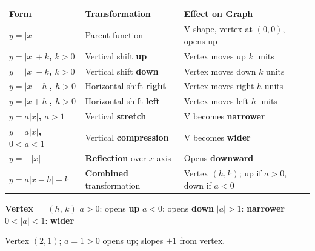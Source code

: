 \documentclass[11pt]{article}
\begin{document}
\begin{tcolorbox}[tablebox,title={Transformation Summary Table: $y = a|x-h|+k$}]
\renewcommand{\arraystretch}{1.35}
\begin{tabular}{>{\bfseries}p{3.5cm} p{4.5cm} p{5.5cm}}
\toprule
\textbf{Form} & \textbf{Transformation} & \textbf{Effect on Graph} \\
\midrule
$y=|x|$ & Parent function & V-shape, vertex at $(0,0)$, opens up \\
$y=|x|+k$,\; $k>0$ & Vertical shift \textbf{up} & Vertex moves up $k$ units \\
$y=|x|-k$,\; $k>0$ & Vertical shift \textbf{down} & Vertex moves down $k$ units \\
$y=|x-h|$,\; $h>0$ & Horizontal shift \textbf{right} & Vertex moves right $h$ units \\
$y=|x+h|$,\; $h>0$ & Horizontal shift \textbf{left} & Vertex moves left $h$ units \\
$y=a|x|$,\; $a>1$ & Vertical \textbf{stretch} & V becomes \textbf{narrower} \\
$y=a|x|$,\; $0<a<1$ & Vertical \textbf{compression} & V becomes \textbf{wider} \\
$y=-|x|$ & \textbf{Reflection} over $x$-axis & Opens \textbf{downward} \\
$y=a|x-h|+k$ & \textbf{Combined} transformation & Vertex $(h,k)$; up if $a>0$, down if $a<0$ \\
\bottomrule
\end{tabular}
\end{tcolorbox}

\begin{tcolorbox}[keybox,title={Key Concepts}]
\textbf{Vertex} $= (h,\,k)$\quad
$a>0$: opens \textbf{up}\quad
$a<0$: opens \textbf{down}\quad
$|a|>1$: \textbf{narrower}\quad
$0<|a|<1$: \textbf{wider}
\end{tcolorbox}

\begin{tcolorbox}[exbox,title={Example: Graph $y=|x-2|+1$}]
Vertex $(2,1)$; $a=1>0$ opens up; slopes $\pm1$ from vertex.
\hfill
{}
\end{tcolorbox}
\end{document}
